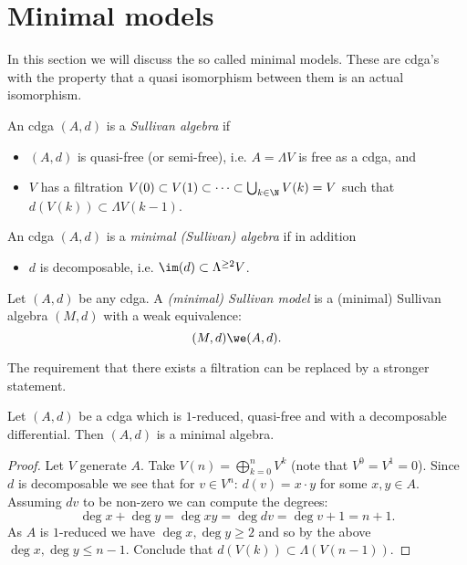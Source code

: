 
\section{Minimal models}

In this section we will discuss the so called minimal models. These are cdga's with the property that a quasi isomorphism between them is an actual isomorphism.

\begin{definition}
	An cdga $(A, d)$ is a \emph{Sullivan algebra} if
	\begin{itemize}
		\item $(A, d)$ is quasi-free (or semi-free), i.e. $A = \Lambda V$ is free as a cdga, and
		\item $V$ has a filtration $V(0) \subset V(1) \subset \cdots \subset \bigcup_{k \in \N} V(k) = V$ such that $d(V(k)) \subset \Lambda V(k-1)$.
	\end{itemize}

	An cdga $(A, d)$ is a \emph{minimal (Sullivan) algebra} if in addition
	\begin{itemize}
		\item $d$ is decomposable, i.e. $\im(d) \subset \Lambda^{\geq 2}V$.
	\end{itemize}
\end{definition}

\begin{definition}
	Let $(A, d)$ be any cdga. A \emph{(minimal) Sullivan model} is a (minimal) Sullivan algebra $(M, d)$ with a weak equivalence:
	$$ (M, d) \we (A, d). $$
\end{definition}

The requirement that there exists a filtration can be replaced by a stronger statement.

\begin{lemma}
	Let $(A, d)$ be a cdga which is $1$-reduced, quasi-free and with a decomposable differential. Then $(A, d)$ is a minimal algebra.
\end{lemma}
\begin{proof}
	Let $V$ generate $A$. Take $V(n) = \bigoplus_{k=0}^n V^k$ (note that $V^0 = V^1 = 0$). Since $d$ is decomposable we see that for $v \in V^n$: $d(v) = x \cdot y$ for some $x, y \in A$. Assuming $dv$ to be non-zero we can compute the degrees:
	$$ \deg{x} + \deg{y} = \deg{xy} = \deg{dv} = \deg{v} + 1 = n + 1. $$
	As $A$ is $1$-reduced we have $\deg{x}, \deg{y} \geq 2$ and so by the above $\deg{x}, \deg{y} \leq n-1$. Conclude that $d(V(k)) \subset \Lambda(V(n-1))$.
\end{proof}


